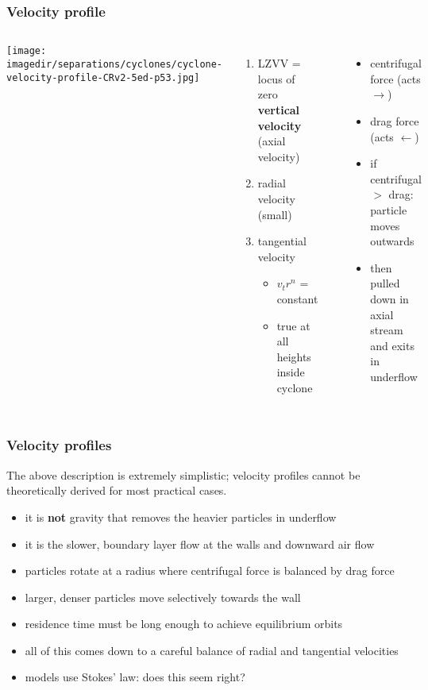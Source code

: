 \begin{frame}\frametitle{Velocity profile}
	\begin{columns}[c]
			\begin{center}
				\texttt{[image: \\imagedir/separations/cyclones/cyclone-velocity-profile-CRv2-5ed-p53.jpg]}
			\end{center}
			{}
			\begin{enumerate}
				\item	LZVV = locus of zero \textbf{vertical velocity} (axial velocity)
				\item	radial velocity (small)
				\item	tangential velocity
					\begin{itemize}
						\item	$v_t r^n$ = constant
						\item	true at all heights inside cyclone 
					\end{itemize}
			\end{enumerate}
			\hrule
			\begin{itemize}
				\item	centrifugal force (acts $\longrightarrow$)
				\item	drag force (acts $\longleftarrow$)
				\item	if centrifugal $>$ drag: particle moves outwards
				\item	then pulled down in axial stream and exits in underflow
			\end{itemize}
	\end{columns}	
\end{frame}

\begin{frame}\frametitle{Velocity profiles}
	\begin{exampleblock}{}
		The above description is extremely simplistic; velocity profiles cannot be theoretically derived for most practical cases.
	\end{exampleblock}
	
	\begin{itemize}
		\item	it is \textbf{not} gravity that removes the heavier particles in underflow
		\item	it is the slower, boundary layer flow at the walls and downward air flow
		\item	particles rotate at a radius where centrifugal force is balanced by drag force
		\item	larger, denser particles move selectively towards the wall
		\item	residence time must be long enough to achieve equilibrium orbits
		\item	all of this comes down to a careful balance of radial and tangential velocities
		\item	models use Stokes' law: does this seem right?
	\end{itemize}	
\end{frame}

